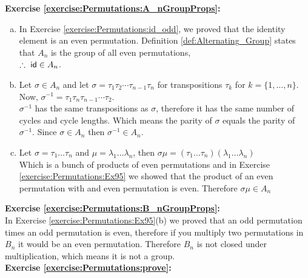 \noindent\textbf{Exercise  \ref{exercise:Permutations:A_nGroupProps}:} %
\begin{enumerate}[(a)]
\item
In Exercise \ref{exercise:Permutations:id_odd}, we proved that the identity element is an even permutation. Definition \ref{def:Alternating_Group} states that $A_{n}$ is the group of all even permutations,\\
$\therefore\ {\sf{i}d}\in A_{n}$.

\item
Let $\sigma\in A_{n}$ and let $\sigma=\tau_{1}\tau_{2}\cdots\tau_{n-1}\tau_{n}$ for transpositions $\tau_{k}$ for $k=\{1,\dots,n\}$. Now, $\sigma^{-1}=\tau_{1}\tau_{n}\tau_{n-1}\cdots\tau_{2}$.\\
        
$\sigma^{-1}$ has the same transpositions as $\sigma$, therefore it has the same number of cycles and cycle lengths. Which means the parity of $\sigma$ equals the parity of $\sigma^{-1}$. Since $\sigma\in A_{n}$ then $\sigma^{-1}\in A_{n}$.
        
\item
Let $\sigma=\tau_{1}\dots\tau_{n}$ and $\mu=\lambda_{1}\dots\lambda_{n}$, then $\sigma\mu=(\tau_{1}\dots\tau_{n})(\lambda_{1}\dots\lambda_{n})$\\

Which is a bunch of products of even permutations and in Exercise \ref{exercise:Permutations:Ex95} we showed that the product of an even permutation with and even permutation is even. Therefore $\sigma\mu\in A_{n}$
\end{enumerate}

\noindent\textbf{Exercise  \ref{exercise:Permutations:B_nGroupProps}:}\\ %
In Exercise  \ref{exercise:Permutations:Ex95}(b) we proved that an odd permutation times an odd permutation is even, therefore if you multiply two permutations in $B_{n}$ it would be an even permutation. Therefore $B_{n}$ is not closed under multiplication, which means it is not a group.\\

\noindent\textbf{Exercise  \ref{exercise:Permutations:prove}:}\\

